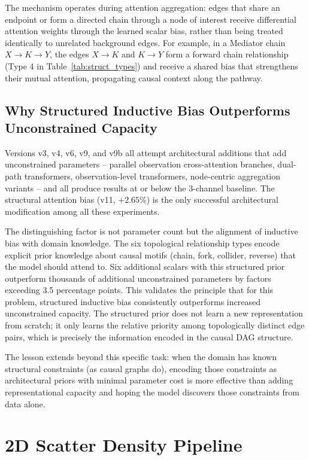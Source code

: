 The mechanism operates during attention aggregation: edges that share an endpoint or form a directed chain through a node of interest receive differential attention weights through the learned scalar bias, rather than being treated identically to unrelated background edges. For example, in a Mediator chain $X \to K \to Y$, the edges $X \to K$ and $K \to Y$ form a forward chain relationship (Type 4 in Table~\ref{tab:struct_types}) and receive a shared bias that strengthens their mutual attention, propagating causal context along the pathway.

\subsection{Why Structured Inductive Bias Outperforms Unconstrained Capacity}

Versions v3, v4, v6, v9, and v9b all attempt architectural additions that add unconstrained parameters -- parallel observation cross-attention branches, dual-path transformers, observation-level transformers, node-centric aggregation variants -- and all produce results at or below the 3-channel baseline. The structural attention bias (v11, $+2.65\%$) is the only successful architectural modification among all these experiments.

The distinguishing factor is not parameter count but the alignment of inductive bias with domain knowledge. The six topological relationship types encode explicit prior knowledge about causal motifs (chain, fork, collider, reverse) that the model should attend to. Six additional scalars with this structured prior outperform thousands of additional unconstrained parameters by factors exceeding 3.5 percentage points. This validates the principle that for this problem, structured inductive bias consistently outperforms increased unconstrained capacity. The structured prior does not learn a new representation from scratch; it only learns the relative priority among topologically distinct edge pairs, which is precisely the information encoded in the causal DAG structure.

The lesson extends beyond this specific task: when the domain has known structural constraints (as causal graphs do), encoding those constraints as architectural priors with minimal parameter cost is more effective than adding representational capacity and hoping the model discovers those constraints from data alone.

\section{2D Scatter Density Pipeline}
\label{sec:2d_results}

